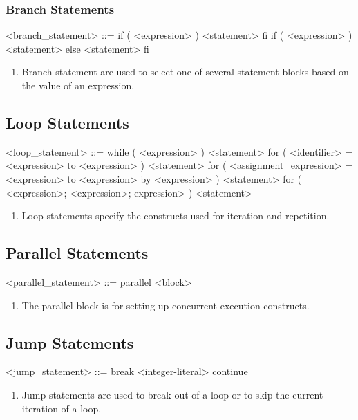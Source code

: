 \subsubsection{Branch Statements}
\begin{grammar}
	<branch_statement> ::= if ( <expression> ) <statement> fi
		\alt if ( <expression> ) <statement> else <statement> fi
\end{grammar}
\begin{enumerate}
	\item Branch statement are used to select one of several statement blocks based on the value of an expression.
\end{enumerate}

\subsection{Loop Statements}
\begin{grammar}
<loop_statement> ::= while ( <expression> ) <statement>
	\alt for ( <identifier> = <expression> to <expression> ) <statement>
	\alt for ( <assignment_expression> = <expression> to <expression> by <expression> ) <statement>
	\alt for ( <expression>; <expression>; expression> ) <statement>
\end{grammar}
\begin{enumerate}
	\item Loop statements specify the constructs used for iteration and repetition.
\end{enumerate}

\subsection{Parallel Statements}
\begin{grammar}
<parallel_statement> ::= parallel <block>
\end{grammar}
\begin{enumerate}
	\item The parallel block is for setting up concurrent execution constructs.
\end{enumerate}

\subsection{Jump Statements}
\begin{grammar}
<jump_statement> ::= break <integer-literal>
	\alt continue
\end{grammar}
\begin{enumerate}
	\item Jump statements are used to break out of a loop or to skip the current iteration of a loop.
\end{enumerate}

